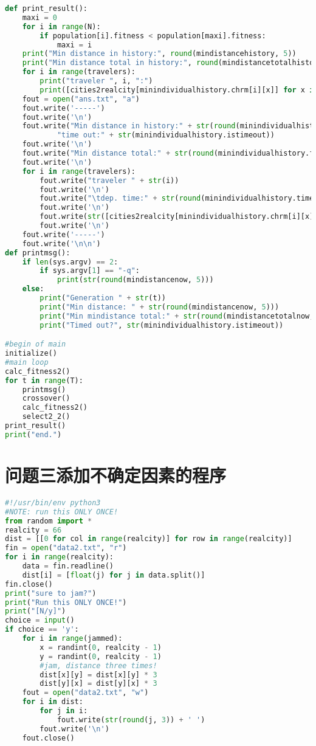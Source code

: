 \documentclass[UTF8,cs4size]{ctexart}
\begin{document}
\begin{lstlisting}[language=Python]
def print_result():
    maxi = 0
    for i in range(N):
        if population[i].fitness < population[maxi].fitness:
            maxi = i
    print("Min distance in history:", round(mindistancehistory, 5))
    print("Min distance total in history:", round(mindistancetotalhistory, 5), "time out:", minindividualhistory.istimeout)
    for i in range(travelers):
        print("traveler ", i, ":")
        print([cities2realcity[minindividualhistory.chrm[i][x]] for x in range(cities) if minindividualhistory.chrm[i][x]])
    fout = open("ans.txt", "a")
    fout.write('-----')
    fout.write('\n')
    fout.write("Min distance in history:" + str(round(minindividualhistory.fitness, 5)) + \
            "time out:" + str(minindividualhistory.istimeout))
    fout.write('\n')
    fout.write("Min distance total:" + str(round(minindividualhistory.fitness2, 5)))
    fout.write('\n')
    for i in range(travelers):
        fout.write("traveler " + str(i))
        fout.write('\n')
        fout.write("\tdep. time:" + str(round(minindividualhistory.timedep[i])) + str((round((minindividualhistory.timedep[i] - int(minindividualhistory.timedep[i])) * 60))))
        fout.write('\n')
        fout.write(str([cities2realcity[minindividualhistory.chrm[i][x]] for x in range(cities) if minindividualhistory.chrm[i][x]]))
        fout.write('\n')
    fout.write('-----')
    fout.write('\n\n')
def printmsg():
    if len(sys.argv) == 2:
        if sys.argv[1] == "-q":
            print(str(round(mindistancenow, 5)))
    else:
        print("Generation " + str(t))
        print("Min distance: " + str(round(mindistancenow, 5)))
        print("Min mindistance total:" + str(round(mindistancetotalnow, 5)))
        print("Timed out?", str(minindividualhistory.istimeout))

#begin of main
initialize()
#main loop
calc_fitness2()
for t in range(T):
    printmsg()
    crossover()
    calc_fitness2()
    select2_2()
print_result()
print("end.")
\end{lstlisting}
\clearpage
\section{问题三添加不确定因素的程序}\label{q3code}
\begin{lstlisting}[language=Python]
#!/usr/bin/env python3
#NOTE: run this ONLY ONCE!
from random import *
realcity = 66
dist = [[0 for col in range(realcity)] for row in range(realcity)]
fin = open("data2.txt", "r")
for i in range(realcity):
    data = fin.readline()
    dist[i] = [float(j) for j in data.split()]
fin.close()
print("sure to jam?")
print("Run this ONLY ONCE!")
print("[N/y]")
choice = input()
if choice == 'y':
    for i in range(jammed):
        x = randint(0, realcity - 1)
        y = randint(0, realcity - 1)
        #jam, distance three times!
        dist[x][y] = dist[x][y] * 3
        dist[y][x] = dist[y][x] * 3
    fout = open("data2.txt", "w")
    for i in dist:
        for j in i:
            fout.write(str(round(j, 3)) + ' ')
        fout.write('\n')
    fout.close()
\end{lstlisting}
\end{document}
